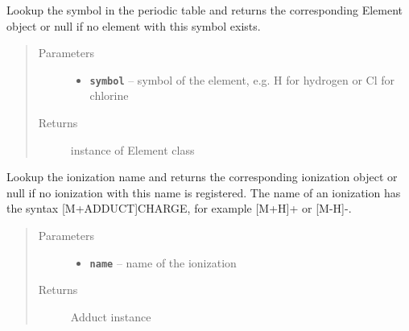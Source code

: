 \documentclass[letterpaper,10pt,openany,oneside]{sphinxmanual}
\begin{document}
\begin{fulllineitems}
\label{library:de.unijena.bioinf.sirius.getElement(String)}
Lookup the symbol in the periodic table and returns the corresponding Element object or null if no element with this symbol exists.
\begin{quote}\begin{description}
\item[{Parameters}] \leavevmode\begin{itemize}
\item {} 
\textbf{\texttt{symbol}} -- symbol of the element, e.g. H for hydrogen or Cl for chlorine

\end{itemize}

\item[{Returns}] \leavevmode
instance of Element class

\end{description}\end{quote}

\end{fulllineitems}


\begin{fulllineitems}
\label{library:de.unijena.bioinf.sirius.getIonization(String)}
Lookup the ionization name and returns the corresponding ionization object or null if no ionization with this name is registered. The name of an ionization has the syntax {[}M+ADDUCT{]}CHARGE, for example {[}M+H{]}+ or {[}M-H{]}-.
\begin{quote}\begin{description}
\item[{Parameters}] \leavevmode\begin{itemize}
\item {} 
\textbf{\texttt{name}} -- name of the ionization

\end{itemize}

\item[{Returns}] \leavevmode
Adduct instance

\end{description}\end{quote}

\end{fulllineitems}
\end{document}
